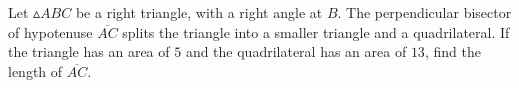 Let $\vartriangle ABC$ be a right triangle, with a right angle at $B$. The perpendicular bisector of hypotenuse $\overline{AC}$ splits the triangle into a smaller triangle and a quadrilateral. If the triangle has an area of $5$ and the quadrilateral has an area of $13$, find the length of $\overline{AC}$.

